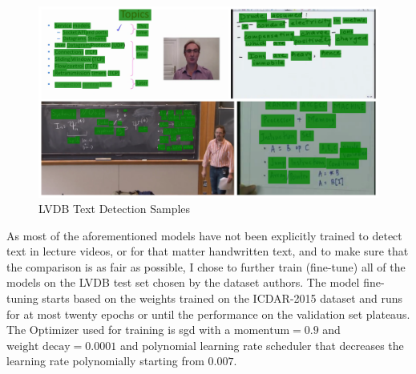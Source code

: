 \begin{figure}[H]
        \centering
        \includegraphics[width=140mm]{figures/lvdb_textdet_collage.png}
        \caption{LVDB Text Detection Samples}
        \label{meth:lvdb_textdet_collage}
\end{figure}

As most of the aforementioned models have not been explicitly trained to detect text in lecture videos, or for that matter handwritten text, and to make sure that the comparison is as fair as possible, I chose to further train (fine-tune) all of the models on the LVDB test set chosen by the dataset authors. The model fine-tuning starts based on the weights trained on the ICDAR-2015 dataset and runs for at most twenty epochs or until the performance on the validation set plateaus. The Optimizer used for training is \gls{sgd} with a $\text{momentum} = 0.9$ and $\text{weight decay} = 0.0001$ and polynomial learning rate scheduler that decreases the learning rate polynomially starting from $0.007$.

